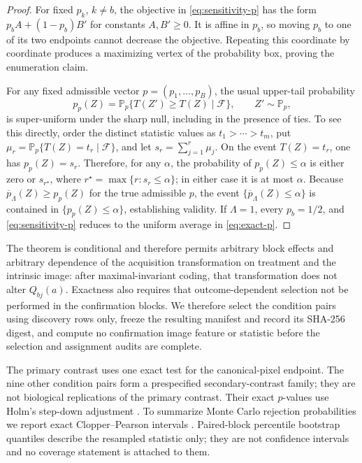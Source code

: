 \documentclass[11pt]{article}
\theoremstyle{definition}
\theoremstyle{remark}
\newcommand{\bP}{\mathbb P}
\newcommand{\1}{\mathbf 1}
\begin{document}
\begin{proof}
For fixed \(p_k\), \(k\ne b\), the objective in
\eqref{eq:sensitivity-p} has the form \(p_b A+(1-p_b)B'\) for constants
\(A,B'\ge0\).  It is affine in \(p_b\), so moving \(p_b\) to one of its two
endpoints cannot decrease the objective.  Repeating this coordinate by
coordinate produces a maximizing vertex of the probability box, proving the
enumeration claim.

For any fixed admissible vector \(p=(p_1,\ldots,p_B)\), the usual upper-tail
probability
\[
 p_p(Z)=\bP_p\{T(Z')\ge T(Z)\mid\mathcal F\},
 \qquad Z'\sim\bP_p,
\]
is super-uniform under the sharp null, including in the presence of ties.
To see this directly, order the distinct statistic values as
\(t_1>\cdots>t_m\), put
\(\mu_r=\bP_p\{T(Z)=t_r\mid\mathcal F\}\), and let
\(s_r=\sum_{j=1}^r\mu_j\).  On the event \(T(Z)=t_r\), one has
\(p_p(Z)=s_r\).  Therefore, for any \(\alpha\), the probability of
\(p_p(Z)\le\alpha\) is either zero or \(s_{r^\star}\), where
\(r^\star=\max\{r:s_r\le\alpha\}\); in either case it is at most \(\alpha\).
Because \(\overline p_\Lambda(Z)\ge p_p(Z)\) for the true admissible \(p\),
the event \(\{\overline p_\Lambda(Z)\le\alpha\}\) is contained in
\(\{p_p(Z)\le\alpha\}\), establishing validity.  If \(\Lambda=1\), every
\(p_b=1/2\), and \eqref{eq:sensitivity-p} reduces to the uniform average in
\eqref{eq:exact-p}.
\end{proof}

The theorem is conditional and therefore permits arbitrary block effects and
arbitrary dependence of the acquisition transformation on treatment and the
intrinsic image: after maximal-invariant coding, that transformation does not
alter \(Q_{bj}(a)\).  Exactness also requires that outcome-dependent selection
not be performed in the confirmation blocks.  We therefore select the
condition pairs using discovery rows only, freeze the resulting manifest and
record its SHA-256 digest, and compute no confirmation image feature or
statistic before the selection and assignment audits are complete.

The primary contrast uses one exact test for the canonical-pixel endpoint.
The nine other condition pairs form a prespecified secondary-contrast family;
they are not biological replications of the primary contrast.  Their exact
\(p\)-values use Holm's step-down adjustment \citep{holm1979simple}.  To
summarize Monte Carlo rejection probabilities we report exact
Clopper--Pearson intervals \citep{clopper1934use}.  Paired-block percentile
bootstrap quantiles describe the resampled statistic only; they are not
confidence intervals and no coverage statement is attached to them.
\end{document}
